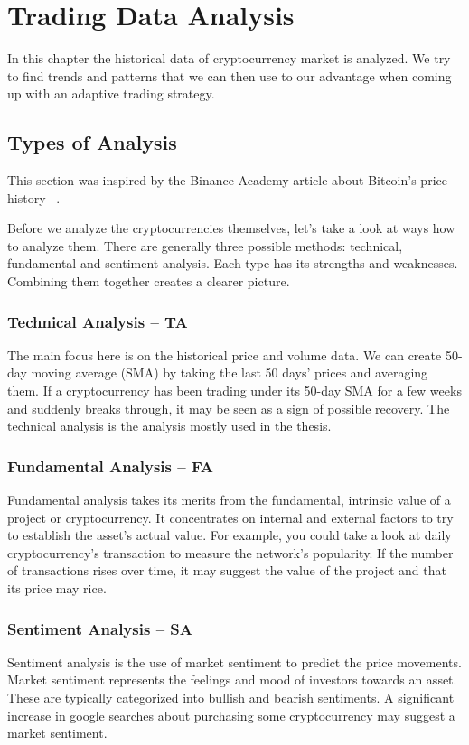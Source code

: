 \chapter{Trading Data Analysis}
\label{chapter-data-analysis}

In this chapter the historical data of cryptocurrency market is analyzed. We try to find trends and patterns that we can then use to our advantage when coming up with an adaptive trading strategy.

\section{Types of Analysis}
This section was inspired by the Binance Academy article about Bitcoin's price history ~\cite{binance:bitcoin-price-history}.

Before we analyze the cryptocurrencies themselves, let's take a look at ways how to analyze them. There are generally three possible methods: technical, fundamental and sentiment analysis. Each type has its strengths and weaknesses. Combining them together creates a clearer picture.

\subsection*{Technical Analysis -- TA}
The main focus here is on the historical price and volume data. We can create 50-day moving average (SMA) by taking the last 50 days' prices and averaging them. If a cryptocurrency has been trading under its 50-day SMA for a few weeks and suddenly breaks through, it may be seen as a sign of possible recovery. The technical analysis is the analysis mostly used in the thesis.

\subsection*{Fundamental Analysis -- FA}
Fundamental analysis takes its merits from the fundamental, intrinsic value of a project or cryptocurrency. It concentrates on internal and external factors to try to establish the asset's actual value. For example, you could take a look at daily cryptocurrency's transaction to measure the network's popularity. If the number of transactions rises over time, it may suggest the value of the project and that its price may rice.

\subsection*{Sentiment Analysis -- SA}
Sentiment analysis is the use of market sentiment to predict the price movements. Market sentiment represents the feelings and mood of investors towards an asset. These are typically categorized into bullish and bearish sentiments. A significant increase in google searches about purchasing some cryptocurrency may suggest a market sentiment.

